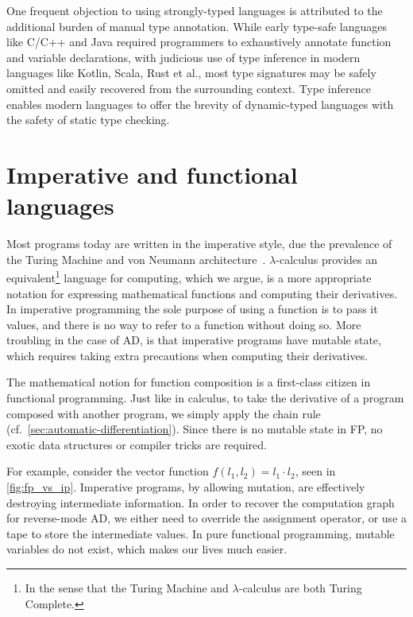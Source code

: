 \documentclass[12pt,initial,twoside,maitrise]{dms}
\numberwithin{equation}{section}
\numberwithin{table}{chapter}
\numberwithin{figure}{chapter}
\begin{document}
One frequent objection to using strongly-typed languages is attributed to the additional burden of manual type annotation. While early type-safe languages like C/C++ and Java required programmers to exhaustively annotate function and variable declarations, with judicious use of type inference in modern languages like Kotlin, Scala, Rust et al., most type signatures may be safely omitted and easily recovered from the surrounding context. Type inference enables modern languages to offer the brevity of dynamic-typed languages with the safety of static type checking.

\section{Imperative and functional languages}

Most programs today are written in the imperative style, due the prevalence of the Turing Machine and von Neumann architecture~\citep{backus2007can}. $\lambda$-calculus provides an equivalent\footnote{In the sense that the Turing Machine and $\lambda$-calculus are both Turing Complete.} language for computing, which we argue, is a more appropriate notation for expressing mathematical functions and computing their derivatives. In imperative programming the sole purpose of using a function is to pass it values, and there is no way to refer to a function without doing so. More troubling in the case of AD, is that imperative programs have mutable state, which requires taking extra precautions when computing their derivatives.

The mathematical notion for function composition is a first-class citizen in functional programming. Just like in calculus, to take the derivative of a program composed with another program, we simply apply the chain rule (cf.~\autoref{sec:automatic-differentiation}). Since there is no mutable state in FP, no exotic data structures or compiler tricks are required.

For example, consider the vector function $f(l_1, l_2) = l_1 \cdot l_2$, seen in \autoref{fig:fp_vs_ip}. Imperative programs, by allowing mutation, are effectively destroying intermediate information. In order to recover the computation graph for reverse-mode AD, we either need to override the assignment operator, or use a tape to store the intermediate values. In pure functional programming, mutable variables do not exist, which makes our lives much easier.
\end{document}
